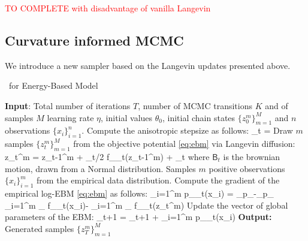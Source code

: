 \documentclass{article}
\begin{document}
\textcolor{red}{TO COMPLETE with disadvantage of vanilla Langevin}

\subsection{Curvature informed MCMC}

We introduce a new sampler based on the Langevin updates presented above.

\begin{algorithm}[H]
\caption{\algo\ for Energy-Based Model} \label{alg:anila}
\begin{algorithmic}[1]
\STATE \textbf{Input}: Total number of iterations $T$, number of MCMC transitions $K$ and of samples $M$ learning rate $\eta$, initial values $\theta_0$, initial chain states $\{ z_{0}^m \}_{m=1}^M$ and $n$ observations $\{ x_{i} \}_{i=1}^n$.
\STATE Compute the anisotropic stepsize as follows: \label{line:step}
\beq\label{eq:step}
\stepsize_t = 
\eeq
\STATE Draw $m$ samples $\{ z_{t}^m \}_{m=1}^M$ from the objective potential \eqref{eq:ebm} via Langevin diffusion:\label{line:langevin}
\beq\label{eq:anila}
z_{t}^{m} = z_{t-1}^m + \stepsize_t/2  \nabla f_{\theta_t}(z_{t-1}^m) +  _t
\eeq
where $\mathsf{B}_t$ is the brownian motion, drawn from a Normal distribution.
\STATE Samples $m$ positive observations $\{ x_{i} \}_{i=1}^m$ from the empirical data distribution.
\STATE Compute the gradient of the empirical log-EBM \eqref{eq:ebm} as follows:
\beq
\nabla \sum_{i=1}^m \log p_{\theta_t}(x_i) = _{p_{}}-_{p_{\theta}} \approx {} \sum_{i=1}^{m} \nabla_{\theta} f_{\theta_t}\left(x_{i}\right)- \sum_{i=1}^{m} \nabla_{\theta} f_{\theta_t}\left(z_t^m\right)
\eeq
\STATE Update the vector of global parameters of the EBM:
\beq
\theta_{t+1} = \theta_{t+1} + \eta \nabla \sum_{i=1}^m \log p_{\theta_t}(x_i)
\eeq
\ENDFOR
\STATE \textbf{Output:} Generated samples $\{ z_{T}^m \}_{m=1}^M$
\end{algorithmic}
\end{algorithm}
\end{document}
